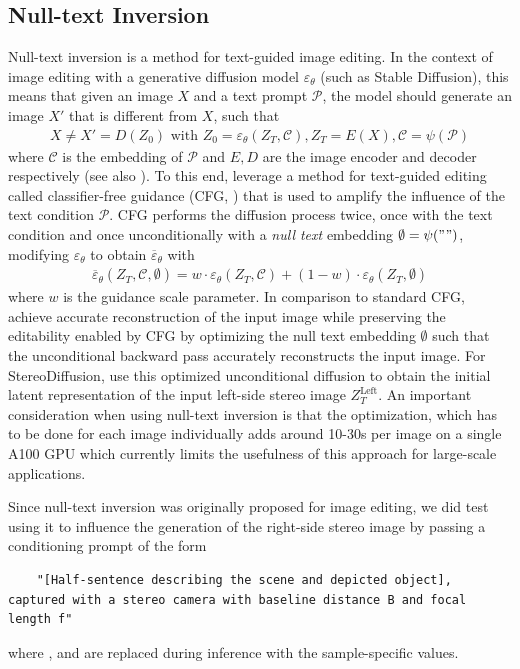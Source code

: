 \subsection{Null-text Inversion}\label{null-text-inv}
Null-text inversion \citep{mokady2023null} is a method for text-guided image editing. In the context of image editing with a generative diffusion model $\varepsilon_\theta$ (such as Stable Diffusion), this means that given an image $X$ and a text prompt $\mathcal{P}$, the model should generate an image $X'$ that is different from $X$, such that
\begin{align}
    X\neq X' = D(Z_0)\text{ with }Z_0=\varepsilon_\theta(Z_T,\mathcal{C}),Z_T=E(X),\mathcal{C}=\psi(\mathcal{P})
\end{align}
where $\mathcal{C}$ is the embedding of $\mathcal{P}$ and $E,D$ are the image encoder and decoder respectively (see also \cite{mokady2023null}). To this end, \cite{mokady2023null} leverage a method for text-guided editing called classifier-free guidance (CFG, \cite{ho2022classifier}) that is used to amplify the influence of the text condition $\mathcal{P}$. CFG performs the diffusion process twice, once with the text condition and once unconditionally with a \emph{null text} embedding $\emptyset=\psi("")$, modifying $\varepsilon_\theta$ to obtain $\overline{\varepsilon}_\theta$ with
\begin{align}\label{eq:cfg}
    \overline{\varepsilon}_\theta(Z_T,\mathcal{C},\emptyset)=w\cdot\varepsilon_\theta(Z_T,\mathcal{C})+(1-w)\cdot\varepsilon_\theta(Z_T,\emptyset)
\end{align}
where $w$ is the guidance scale parameter. In comparison to standard CFG, \cite{mokady2023null} achieve accurate reconstruction of the input image while preserving the editability enabled by CFG by optimizing the null text embedding $\emptyset$ such that the unconditional backward pass accurately reconstructs the input image. For StereoDiffusion, \cite{Wang-2024-stereodiffusion} use this optimized unconditional diffusion to obtain the initial latent representation of the input left-side stereo image $Z_T^\text{Left}$. An important consideration when using null-text inversion is that the optimization, which has to be done for each image individually adds around 10-30s per image on a single A100 GPU which currently limits the usefulness of this approach for large-scale applications.

Since null-text inversion was originally proposed for image editing, we did test using it to influence the generation of the right-side stereo image by passing a conditioning prompt of the form
\begin{lstlisting}
    "[Half-sentence describing the scene and depicted object], captured with a stereo camera with baseline distance B and focal length f"
\end{lstlisting}
where \mono{[...]},  and  are replaced during inference with the sample-specific values.

